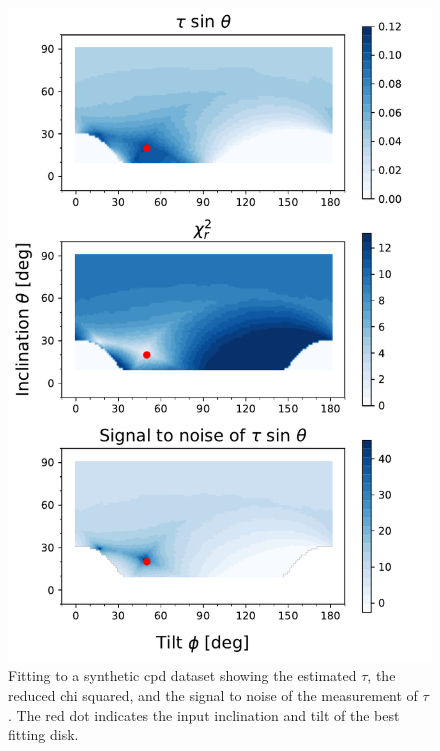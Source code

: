 \documentclass[longauth]{aa} %
\begin{document}
\begin{figure}[htb]
    \includegraphics[width=\columnwidth]{simdisk_b.pdf}
    \caption{Fitting to a synthetic \ac{cpd} dataset showing the estimated $\tau$, the reduced chi squared, and the signal to noise of the measurement of $\tau$.
    The red dot indicates the input inclination and tilt of the best fitting disk.}
    \label{simdisk}
\end{figure}
\end{document}
